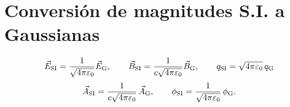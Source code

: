 \section{Conversión de magnitudes S.I. a Gaussianas}
\begin{equation}
\vec{E}_{\rm SI}=\frac{1}{\sqrt{4\pi\varepsilon_0}}\vec{E}_{\rm G}, \qquad 
\vec{B}_{\rm SI}= \frac{1}{c\sqrt{4\pi\varepsilon_0}}\vec{B}_{\rm G}, \qquad 
q_{\rm SI}=\sqrt{4\pi\varepsilon_0}\,q_{\rm G}
\end{equation}
\begin{equation}
\vec{A}_{\rm SI}=\frac{1}{c\sqrt{4\pi\varepsilon_0}}\,\vec{A}_{\rm G}, \qquad
\phi_{\rm SI}=\frac{1}{\sqrt{4\pi\varepsilon_0}}\,\phi_{\rm G}.
\end{equation}

